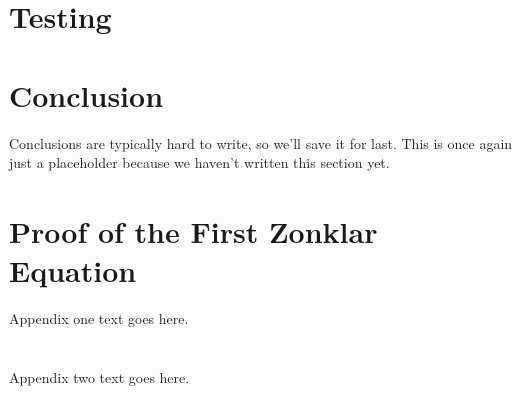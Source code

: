 \documentclass[a4paper, 10pt, american]{article}
\begin{document}
\section{Testing}
\label{sec:testing}

\section{Conclusion}
\label{sec:conclusion}

Conclusions are typically hard to write, so we'll save it for last. This is
once again just a placeholder because we haven't written this section yet.

\lipsum[1]

\clearpage %

\printbibliography

\appendices
\section{Proof of the First Zonklar Equation}
Appendix one text goes here.

\section{}
Appendix two text goes here.
\end{document}
